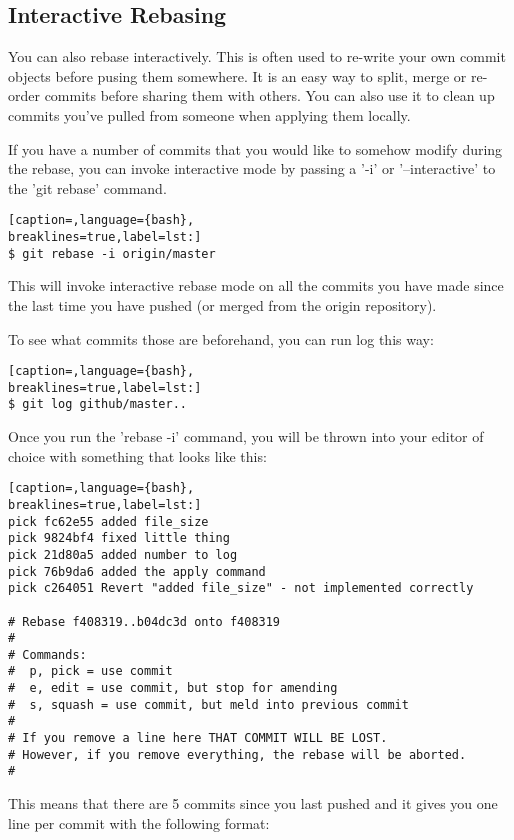 \subsection{Interactive Rebasing}
You can also rebase interactively. This is often used to re-write your own
commit objects before pusing them somewhere. It is an easy way to split, merge
or re-order commits before sharing them with others. You can also use it to
clean up commits you've pulled from someone when applying them locally.

If you have a number of commits that you would like to somehow modify during
the rebase, you can invoke interactive mode by passing a '-i' or
'--interactive' to the 'git rebase' command.
\lstset{basicstyle=\scriptsize, numbers=none, captionpos=b, tabsize=4}
\begin{lstlisting}[caption=,language={bash},
breaklines=true,label=lst:]
$ git rebase -i origin/master
\end{lstlisting}

This will invoke interactive rebase mode on all the commits you have made since
the last time you have pushed (or merged from the origin repository).

To see what commits those are beforehand, you can run log this way:

\lstset{basicstyle=\scriptsize, numbers=none, captionpos=b, tabsize=4}
\begin{lstlisting}[caption=,language={bash},
breaklines=true,label=lst:]
$ git log github/master..
\end{lstlisting}
Once you run the 'rebase -i' command, you will be thrown into your editor of
choice with something that looks like this:
\lstset{basicstyle=\scriptsize, numbers=none, captionpos=b, tabsize=4}
\begin{lstlisting}[caption=,language={bash},
breaklines=true,label=lst:]
pick fc62e55 added file_size
pick 9824bf4 fixed little thing
pick 21d80a5 added number to log
pick 76b9da6 added the apply command
pick c264051 Revert "added file_size" - not implemented correctly

# Rebase f408319..b04dc3d onto f408319
#
# Commands:
#  p, pick = use commit
#  e, edit = use commit, but stop for amending
#  s, squash = use commit, but meld into previous commit
#
# If you remove a line here THAT COMMIT WILL BE LOST.
# However, if you remove everything, the rebase will be aborted.
#
\end{lstlisting}

This means that there are 5 commits since you last pushed and it gives you one
line per commit with the following format:

